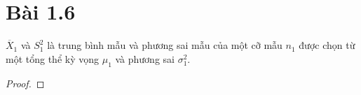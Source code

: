 \section*{Bài 1.6}
%

\begin{problem}{1.6}
$\overline{X}_1$ và $S^2_1$ là trung bình mẫu và phương sai mẫu của một cỡ mẫu $n_1$ được chọn từ một tổng thể kỳ vọng $\mu_1$ và phương sai $\sigma_1^2$. 
\end{problem}

\begin{proof}
\end{proof}